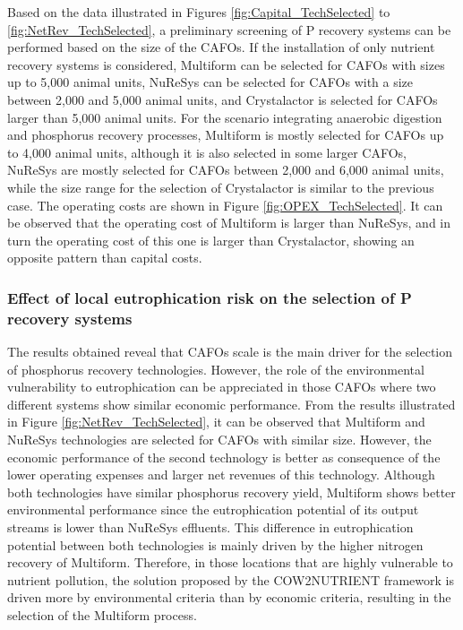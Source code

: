 \documentclass[authoryear]{elsarticle}
\begin{document}
Based on the data illustrated in Figures \ref{fig:Capital_TechSelected} to \ref{fig:NetRev_TechSelected}, a preliminary screening of P recovery systems can be performed based on the size of the CAFOs. If the installation of only nutrient recovery systems is considered, Multiform can be selected for CAFOs with sizes up to 5,000 animal units, NuReSys can be selected for CAFOs with a size between 2,000 and 5,000 animal units, and Crystalactor is selected for CAFOs larger than 5,000 animal units. For the scenario integrating anaerobic digestion and phosphorus recovery processes, Multiform is mostly selected for CAFOs up to 4,000 animal units, although it is also selected in some larger CAFOs, NuReSys are mostly selected for CAFOs between 2,000 and 6,000 animal units, while the size range for the selection of Crystalactor is similar to the previous case. The operating costs are shown in Figure \ref{fig:OPEX_TechSelected}. It can be observed that the operating cost of Multiform is larger than NuReSys, and in turn the operating cost of this one is larger than Crystalactor, showing an opposite pattern than capital costs.

\subsubsection{Effect of local eutrophication risk on the selection of P recovery systems}
The results obtained reveal that CAFOs scale is the main driver for the selection of phosphorus recovery technologies. However, the role of the environmental vulnerability to eutrophication can be appreciated in those CAFOs where two different systems show similar economic performance. From the results illustrated in Figure \ref{fig:NetRev_TechSelected}, it can be observed that Multiform and NuReSys technologies are selected for CAFOs with similar size. However, the economic performance of the second technology is better
as consequence of the lower operating expenses and larger net revenues of this technology. Although both technologies have similar phosphorus recovery yield, Multiform shows better environmental performance since the eutrophication potential of its output streams is lower than NuReSys effluents. This difference in eutrophication potential between both technologies is mainly driven by the higher nitrogen recovery of Multiform. Therefore, in those locations that are highly vulnerable to nutrient pollution, the solution proposed by the COW2NUTRIENT framework is driven more by environmental criteria than by economic criteria, resulting in the selection of the Multiform process.
\end{document}
